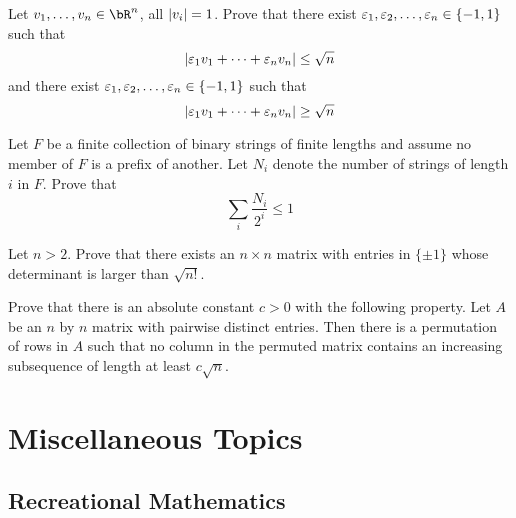 \documentclass[12pt]{article}
\begin{document}
        \begin{exercise}
            Let $v_1,\dots,v_n\in \bR^n$, all $\left\lvert v_i \right\rvert=1$. Prove that there exist $\varepsilon_1,\varepsilon_2,\dots,\varepsilon_n\in \{-1,1\}$ such that 
            \[|\varepsilon_1v_1+\cdots+\varepsilon_nv_n|\leq \sqrt{n}\]
            and there exist $\varepsilon_1,\varepsilon_2,\dots,\varepsilon_n\in \{-1,1\}$ such that
            \[|\varepsilon_1v_1+\cdots+\varepsilon_nv_n|\geq \sqrt{n}\]
        \end{exercise}
            
        \begin{exercise}
            Let $F$ be a finite collection of binary strings of finite lengths and assume no member of $F$ is a prefix of another. Let $N_i$ denote the number of strings of length $i$ in $F$. Prove that \[\sum_i \frac{N_i}{2^i}\leq 1\]
        \end{exercise}
            
        \begin{exercise}
            Let $n>2$. Prove that there exists an $n\times n$ matrix with entries in $\{\pm 1\}$ whose determinant is larger than $\sqrt{n!}$.
        \end{exercise}
            
        \begin{exercise}
            Prove that there is an absolute constant $c>0$ with the following property. Let $A$ be an $n$ by $n$ matrix with pairwise distinct entries. Then there is a permutation of rows in $A$ such that no column in the permuted matrix contains an increasing subsequence of length at least $c\sqrt{n}$.
        \end{exercise}

\section{Miscellaneous Topics}

    \subsection{Recreational Mathematics}
\end{document}
